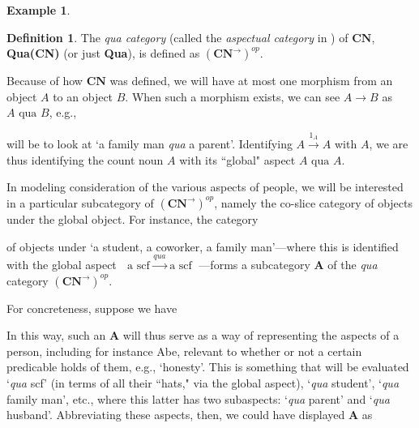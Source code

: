 \documentclass[11pt]{book}
\theoremstyle{definition}
\newtheorem{example}{Example}[section]
\theoremstyle{definition}
\newtheorem{definition}{Definition}[section]
\theoremstyle{definition}
\theoremstyle{theorem}
\theoremstyle{definition}
\begin{document}
\begin{example}
	\begin{definition}
		The \textit{qua category} (called the \textit{aspectual category} in \cite{la_palme_reyes_models_1999}) of $\textbf{CN}$, \textbf{Qua(CN)} (or just \textbf{Qua}), is defined as $(\textbf{CN}^{\rightarrow})^{op}$. 
	\end{definition}
	Because of how $\textbf{CN}$ was defined, we will have at most one morphism from an object $A$ to an object $B$. When such a morphism exists, we can see $A \rightarrow B$ as $A \text{ qua } B$, e.g., 
	\begin{center} 
	\end{center} 
	will be to look at `a family man \textit{qua} a parent'. Identifying $A \xrightarrow{1_A} A$ with $A$, we are thus identifying the count noun $A$ with its ``global" aspect $A \text{ qua } A$. \par 
	In modeling consideration of the various aspects of people, we will be interested in a particular subcategory of $(\textbf{CN}^{\rightarrow})^{op}$, namely the co-slice category of objects under the global object. For instance, the category 
	\begin{center} 
	\end{center} 
	of objects under `a student, a coworker, a family man'---where this is identified with the global aspect $\boxed{\text{ a scf } } \xrightarrow{qua} \boxed{\text{ a scf }}$---forms a subcategory $\textbf{A}$ of the \textit{qua} category $(\textbf{CN}^{\rightarrow})^{op}$. \par 
	For concreteness, suppose we have 
	\begin{center}
	\end{center}
	In this way, such an $\textbf{A}$ will thus serve as a way of representing the aspects of a person, including for instance Abe, relevant to whether or not a certain predicable holds of them, e.g., `honesty'. This is something that will be evaluated `\textit{qua} scf' (in terms of all their ``hats," via the global aspect), `\textit{qua} student', `\textit{qua} family man', etc., where this latter has two subaspects: `\textit{qua} parent' and `\textit{qua} husband'. Abbreviating these aspects, then, we could have displayed $\textbf{A}$ as 

\end{example}
\end{document}
